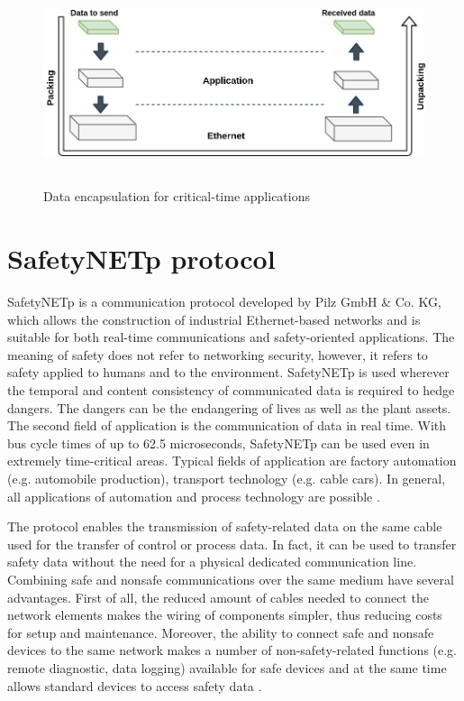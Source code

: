 \begin{figure}
\centering
\includegraphics[width=12cm,height=6cm]{figures/indutrial_ethernet/data_encapsulation_for_critical_time_applications.jpg}
\caption{Data encapsulation for critical-time applications}\label{data_encapsulation_for_critical_time_applications}
\end{figure}

\section{SafetyNETp protocol}
\label{SafetyNETp}
SafetyNETp is a communication protocol developed by Pilz GmbH & Co. KG, which allows the
construction of industrial Ethernet-based networks and is suitable for both real-time communications and
safety-oriented applications. The meaning of safety does not refer to networking security, however, it
refers to safety applied to humans and to the environment. SafetyNETp is used wherever the temporal and content
consistency of communicated data is required to hedge dangers. The dangers can be the endangering of lives as well as the plant assets.
The second field of application is the communication of data in real time. With bus cycle times of
up to 62.5 microseconds, SafetyNETp can be used even in extremely time-critical areas.
Typical fields of application are factory automation (e.g. automobile production), transport
technology (e.g. cable cars). In general, all applications of automation and process technology are
possible \cite{KunbusSafetyNETp}.


The protocol enables the transmission of safety-related data on the same
cable used for the transfer of control or process data. In fact, it can
be used to transfer safety data without the need for a physical dedicated communication line.
Combining safe and nonsafe communications over the same medium have several advantages. First of
all, the reduced amount of cables needed to connect the network elements makes the wiring of components simpler, thus reducing costs for setup and maintenance. Moreover, the ability to connect safe
and nonsafe devices to the same network makes a number of non-safety-related functions (e.g. remote
diagnostic, data logging) available for safe devices and at the same time allows standard devices to
access safety data \cite{zurawski2014industrial}.

